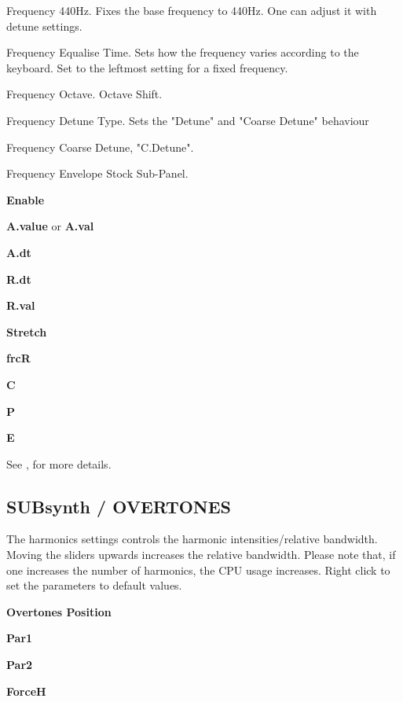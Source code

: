    Frequency 440Hz.
   Fixes the base frequency to 440Hz.
   One can adjust it with detune settings.

   Frequency Equalise Time.
   Sets how the frequency varies according to the keyboard.
   Set to the leftmost setting for a fixed frequency.

   Frequency Octave.
   Octave Shift.

   Frequency Detune Type.
   Sets the "Detune" and "Coarse Detune" behaviour

   Frequency Coarse Detune, "C.Detune".

   Frequency Envelope Stock Sub-Panel.

   \begin{enumber}
      \item \textbf{Enable}
      \item \textbf{A.value} or \textbf{A.val}
      \item \textbf{A.dt}
      \item \textbf{R.dt}
      \item \textbf{R.val}
      \item \textbf{Stretch}
      \item \textbf{frcR}
      \item \textbf{C}
      \item \textbf{P}
      \item \textbf{E}
   \end{enumber}

   See , for more details.

\subsection{SUBsynth / OVERTONES}
\label{subsec:subsynth_overtones}

The harmonics settings controls the harmonic intensities/relative bandwidth.
Moving the sliders upwards increases the relative bandwidth.  Please note
that, if one increases the number of harmonics, the CPU usage increases. Right
click to set the parameters to default values.

   \begin{enumber}
      \item \textbf{Overtones Position}
      \item \textbf{Par1}
      \item \textbf{Par2}
      \item \textbf{ForceH}
   \end{enumber}

